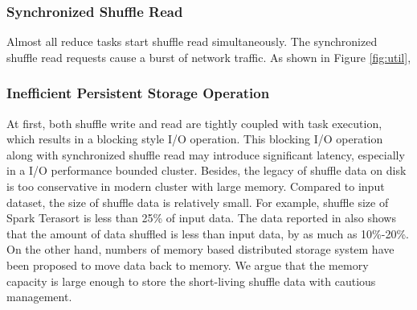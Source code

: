\subsubsection{Synchronized Shuffle Read}
Almost all reduce tasks start shuffle read simultaneously. 
The synchronized shuffle read requests cause a burst of network traffic. 
As shown in Figure \ref{fig:util}, 

\subsubsection{Inefficient Persistent Storage Operation}
At first, both shuffle write and read are tightly coupled with task execution, which results in a blocking style I/O operation. 
This blocking I/O operation along with synchronized shuffle read may introduce significant latency, especially in a I/O performance bounded cluster.
Besides, the legacy of  shuffle data on disk is too conservative in modern cluster with large memory. 
Compared to input dataset, the size of shuffle data is relatively small. 
For example, shuffle size of Spark Terasort \cite{spark-tera} is less than 25\% of input data. 
The data reported in \cite{makingsense} also shows that the amount of data shuffled is less than input data, by as much as 10\%-20\%. 
On the other hand, numbers of memory based distributed storage system have been proposed \cite{memcached, tachyon, ramcloud} to move data back to memory. 
We argue that the memory capacity is large enough to store the short-living shuffle data with cautious management.

\ifrevision
{}
\fi
